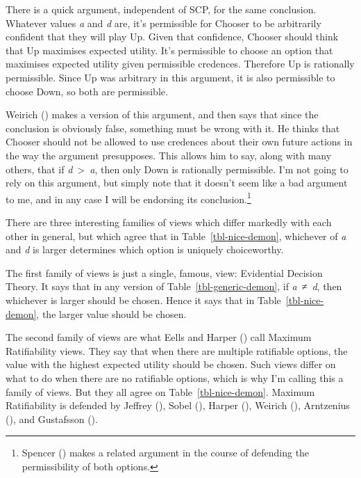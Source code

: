 \documentclass[
  11pt,
  letterpaper,
  DIV=11,
  numbers=noendperiod,
  twoside]{scrartcl}
\begin{document}
There is a quick argument, independent of SCP, for the same conclusion.
Whatever values \emph{a} and \emph{d} are, it's permissible for Chooser
to be arbitrarily confident that they will play Up. Given that
confidence, Chooser should think that Up maximises expected utility.
It's permissible to choose an option that maximises expected utility
given permissible credences. Therefore Up is rationally permissible.
Since Up was arbitrary in this argument, it is also permissible to
choose Down, so both are permissible.

Weirich () makes a version of this
argument, and then says that since the conclusion is obviously false,
something must be wrong with it. He thinks that Chooser should not be
allowed to use credences about their own future actions in the way the
argument presupposes. This allows him to say, along with many others,
that if \emph{d}~\textgreater~\emph{a}, then only Down is rationally
permissible. I'm not going to rely on this argument, but simply note
that it doesn't seem like a bad argument to me, and in any case I will
be endorsing its conclusion.\footnote{Spencer
  () makes a related argument in the
  course of defending the permissibility of both options.}

There are three interesting families of views which differ markedly with
each other in general, but which agree that in
Table~\ref{tbl-nice-demon}, whichever of \emph{a} and \emph{d} is larger
determines which option is uniquely choiceworthy.

The first family of views is just a single, famous, view: Evidential
Decision Theory. It says that in any version of
Table~\ref{tbl-generic-demon}, if \emph{a}~≠~\emph{d}, then whichever is
larger should be chosen. Hence it says that in
Table~\ref{tbl-nice-demon}, the larger value should be chosen.

The second family of views are what Eells and Harper
() call Maximum Ratifiability views.
They say that when there are multiple ratifiable options, the value with
the highest expected utility should be chosen. Such views differ on what
to do when there are no ratifiable options, which is why I'm calling
this a family of views. But they all agree on
Table~\ref{tbl-nice-demon}. Maximum Ratifiability is defended by Jeffrey
(), Sobel
(), Harper
(), Weirich
(), Arntzenius
(), and Gustafsson
().
\end{document}
